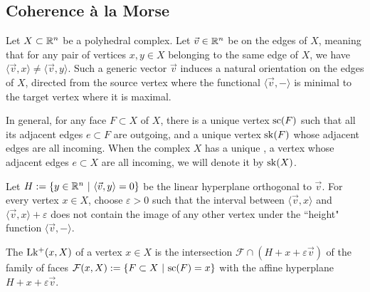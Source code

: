 
\subsection{Coherence \`a la Morse}

Let $X\subset \mathbb R^n$ be a polyhedral complex. 
Let $\vec v \in \mathbb R^n$ be  on the edges of $X$, meaning that for any pair of vertices $x,y \in X$ belonging to the same edge of $X$, we have $\langle \vec v , x \rangle \neq \langle \vec v, y\rangle$.  
Such a generic vector $\vec v$ induces a natural orientation on the edges of $X$, directed from the source vertex where the functional $\langle \vec v, - \rangle$ is minimal to the target vertex where it is maximal. 

In general, for any face $F \subset X$ of $X$, there is a unique  vertex $\mathrm{sc}(F)$ such that all its adjacent edges $e \subset F$ are outgoing, and a unique  vertex $\mathrm{sk}(F)$ whose adjacent edges are all incoming.
When the complex $X$ has a unique , a vertex whose adjacent edges $e \subset X$ are all incoming, we will denote it by $\mathrm{sk}(X)$. 

Let $H:=\{y \in \mathbb R^n \ | \ \langle \vec v , y \rangle = 0\}$ be the linear hyperplane orthogonal to $\vec v$.  
For every vertex $x \in X$, choose $\varepsilon >0$ such that the interval between $\langle \vec v , x \rangle$ and $\langle \vec v , x \rangle + \varepsilon$ does not contain the image of any other vertex under the ``height" function $\langle \vec v, - \rangle$. 

\begin{definition}
    The  $\operatorname{Lk^{+}}(x,X)$ of a vertex $x \in X$ is the intersection $\mathcal{F} \cap (H+x+\varepsilon \vec v)$ of the family of faces $\mathcal{F}(x,X):=\{ F \subset X \ | \ \mathrm{sc}(F)=x \}$ with the affine hyperplane $H+x+\varepsilon \vec v$. 
\end{definition}


